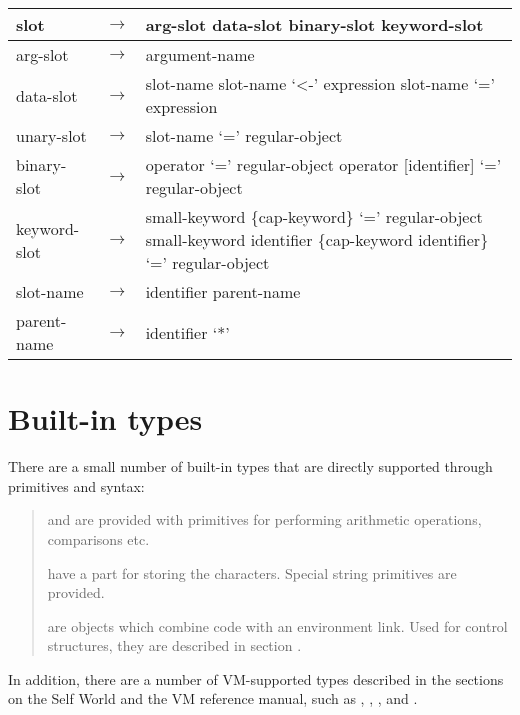 \documentclass[letterpaper,10pt,english]{sphinxmanual}
\begin{document}
\begin{tabulary}{\linewidth}{|L|L|L|}
\\
\hline
slot
&
\(\rightarrow\)
&
arg-slot \textbar{} data-slot \textbar{} binary-slot \textbar{} keyword-slot
\\
\hline
arg-slot
&
\(\rightarrow\)
&
argument-name
\\
\hline
data-slot
&
\(\rightarrow\)
&
slot-name \textbar{} slot-name ‘\textless{}-’ expression \textbar{} slot-name ‘=’ expression
\\
\hline
unary-slot
&
\(\rightarrow\)
&
slot-name ‘=’ regular-object
\\
\hline
binary-slot
&
\(\rightarrow\)
&
operator ‘=’ regular-object \textbar{} operator {[}identifier{]} ‘=’ regular-object
\\
\hline
keyword-slot
&
\(\rightarrow\)
&
small-keyword \{cap-keyword\} ‘=’ regular-object \textbar{} small-keyword identifier \{cap-keyword identifier\} ‘=’ regular-object
\\
\hline
slot-name
&
\(\rightarrow\)
&
identifier \textbar{} parent-name
\\
\hline
parent-name
&
\(\rightarrow\)
&
identifier ‘*’
\\
\hline\end{tabulary}



\section{Built-in types}
\label{\detokenize{builtintypes::doc}}\label{\detokenize{builtintypes:built-in-types}}
There are a small number of built-in types that are directly supported through primitives and syntax:
\begin{quote}

 and  are provided with primitives for performing arithmetic operations, comparisons etc.

 have a  part for storing the characters. Special string primitives are provided.

 are objects which combine code with an environment link. Used for control structures, they are described in section .
\end{quote}

In addition, there are a number of VM-supported types described in the sections on the Self World
and the VM reference manual, such as , , ,  and .
\end{document}
